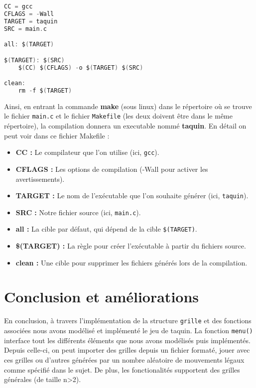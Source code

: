 \documentclass{article}
\begin{document}
\begin{lstlisting}[language=C]
CC = gcc
CFLAGS = -Wall
TARGET = taquin
SRC = main.c

all: $(TARGET)

$(TARGET): $(SRC)
	$(CC) $(CFLAGS) -o $(TARGET) $(SRC)

clean:
	rm -f $(TARGET)
\end{lstlisting}
Ainsi, en entrant la commande \textbf{make} (sous linux) dans le répertoire où se trouve le fichier \texttt{main.c} et le fichier \texttt{Makefile} (les deux doivent être dans le même répertoire), la compilation donnera un executable nommé \textbf{taquin}.
En détail on peut voir dans ce fichier Makefile :\\
\begin{itemize}

\item \textbf{CC :} Le compilateur que l'on utilise (ici, \texttt{gcc}).
\item \textbf{CFLAGS :} Les options de compilation (-Wall pour activer les avertissements).
\item \textbf{TARGET :} Le nom de l'exécutable que l'on souhaite générer (ici, \texttt{taquin}).
\item \textbf{SRC :} Notre fichier source (ici, \texttt{main.c}).
\item \textbf{all :} La cible par défaut, qui dépend de la cible \texttt{\$(TARGET)}.
\item \textbf{\$(TARGET) :} La règle pour créer l'exécutable à partir du fichiers source.
\item \textbf{clean :} Une cible pour supprimer les fichiers générés lors de la compilation.

\end{itemize}

\section{Conclusion et améliorations}

En conclusion, à travers l'implémentation de la structure \texttt{grille} et des fonctions associées nous avons modélisé et implémenté le jeu de taquin. La fonction \texttt{menu()} interface tout les différents éléments que nous avons modélisés puis implémentés. Depuis celle-ci, on peut importer des grilles depuis un fichier formaté, jouer avec ces grilles ou d'autres générées par un nombre aléatoire de mouvements légaux comme spécifié dans le sujet. De plus, les fonctionalités supportent des grilles générales (de taille n>2). 
\end{document}
